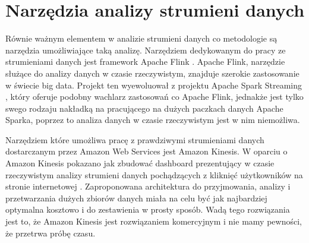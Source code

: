 \section{Narzędzia analizy strumieni danych}

Równie ważnym elementem w analizie strumieni danych co metodologie są narzędzia umożliwiające taką analizę. Narzędziem dedykowanym do pracy ze strumieniami danych jest framework Apache Flink \cite{Flink}. Apache Flink, narzędzie służące do analizy danych w czasie rzeczywistym, znajduje szerokie zastosowanie w świecie big data. Projekt ten wyewoluował z projektu Apache Spark Streaming \cite{SparkStreaming}, który oferuje podobny wachlarz zastosowań co Apache Flink, jednakże jest tylko swego rodzaju nakładką na pracującego na dużych paczkach danych Apache Sparka, poprzez to analiza danych w czasie rzeczywistym jest w nim niemożliwa.

Narzędziem które umożliwa pracę z prawdziwymi strumieniami danych dostarczanym przez Amazon Web Services jest Amazon Kinesis. W oparciu o Amazon Kinesis pokazano jak zbudować dashboard prezentujący w czasie rzeczywistym analizy strumieni danych pochądzących z kliknięć użytkowników na stronie internetowej \cite{Kinesis}. Zaproponowana architektura do przyjmowania, analizy i przetwarzania dużych zbiorów danych miała na celu być jak najbardziej optymalna kosztowo i do zestawienia w prosty sposób. Wadą tego rozwiązania jest to, że Amazon Kinesis jest rozwiązaniem komercyjnym i nie mamy pewności, że przetrwa próbę czasu.
